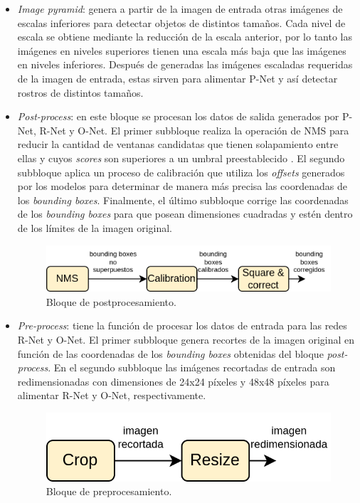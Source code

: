 \begin{itemize}
	\item \textit{Image pyramid}: genera a partir de la imagen de entrada otras imágenes de escalas inferiores para detectar objetos de distintos tamaños. Cada nivel de escala se obtiene mediante la reducción de la escala anterior, por lo tanto las imágenes en niveles superiores tienen una escala más baja que las imágenes en niveles inferiores. Después de generadas las imágenes escaladas requeridas de la imagen de entrada, estas sirven para alimentar P-Net y así detectar rostros de distintos tamaños.

	\item \textit{Post-process}: en este bloque se procesan los datos de salida generados por P-Net, R-Net y O-Net. El primer subbloque realiza la operación de NMS para reducir la cantidad de ventanas candidatas que tienen solapamiento entre ellas y cuyos \textit{scores} son superiores a un umbral preestablecido . El segundo subbloque aplica un proceso de calibración que utiliza los \textit{offsets} generados por los modelos para determinar de manera más precisa las coordenadas de los \textit{bounding boxes}. Finalmente, el último subbloque corrige las coordenadas de los \textit{bounding boxes} para que posean dimensiones cuadradas y estén dentro de los límites de la imagen original.
	\begin{figure}[h]
		\centering
		\includegraphics[scale=0.35]{./Figures/mtcnn_postprocess.png}
		\caption{Bloque de postprocesamiento.}
		\label{fig:mtcnn_postprocess}
	\end{figure}
	
	\item \textit{Pre-process}: tiene la función de procesar los datos de entrada para las redes R-Net y O-Net. El primer subbloque genera recortes de la imagen original en función de las coordenadas de los \textit{bounding boxes} obtenidas del bloque \textit{post-process}. En el segundo subbloque las imágenes recortadas de entrada son redimensionadas con dimensiones de 24x24 píxeles y 48x48 píxeles para alimentar R-Net y O-Net, respectivamente.
	\begin{figure}[h]
		\centering
		\includegraphics[scale=0.35]{./Figures/mtcnn_preprocess.png}
		\caption{Bloque de preprocesamiento.}
		\label{fig:mtcnn_preprocess}
	\end{figure}

\end{itemize}


